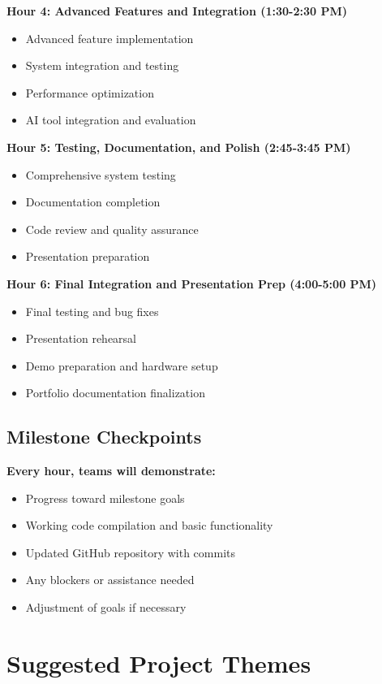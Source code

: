 \documentclass[11pt,a4paper]{article}
\begin{document}
\textbf{Hour 4: Advanced Features and Integration (1:30-2:30 PM)}
\begin{itemize}
    \item Advanced feature implementation
    \item System integration and testing
    \item Performance optimization
    \item AI tool integration and evaluation
\end{itemize}

\textbf{Hour 5: Testing, Documentation, and Polish (2:45-3:45 PM)}
\begin{itemize}
    \item Comprehensive system testing
    \item Documentation completion
    \item Code review and quality assurance
    \item Presentation preparation
\end{itemize}

\textbf{Hour 6: Final Integration and Presentation Prep (4:00-5:00 PM)}
\begin{itemize}
    \item Final testing and bug fixes
    \item Presentation rehearsal
    \item Demo preparation and hardware setup
    \item Portfolio documentation finalization
\end{itemize}

\subsection{Milestone Checkpoints}
\textbf{Every hour, teams will demonstrate:}
\begin{itemize}
    \item Progress toward milestone goals
    \item Working code compilation and basic functionality
    \item Updated GitHub repository with commits
    \item Any blockers or assistance needed
    \item Adjustment of goals if necessary
\end{itemize}

\section{Suggested Project Themes}
\end{document}
